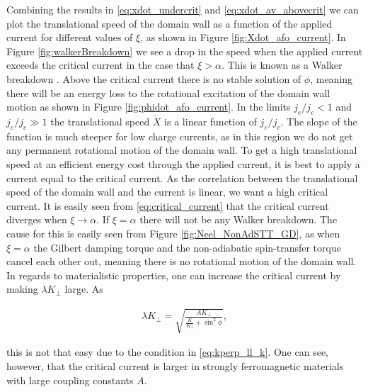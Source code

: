 \documentclass[1p]{elsarticle}		%
\numberwithin{equation}{section}
\begin{document}
Combining the results in \eqref{eq:xdot_undercrit} and \eqref{eq:xdot_av_abovecrit} we can plot the translational speed of the domain wall as a function of the applied current for different values of $\xi$, as shown in Figure \ref{fig:Xdot_afo_current}. In Figure \ref{fig:walkerBreakdown} we see a drop in the speed when the applied current exceeds the critical current in the case that $\xi > \alpha$. This is known as a Walker breakdown \cite{SchryerWalker1974}. Above the critical current there is no stable solution of $\phi$, meaning there will be an energy loss to the rotational excitation of the domain wall motion as shown in Figure \ref{fig:phidot_afo_current}. In the limits $j_e/j_c < 1$ and $j_e/j_c \gg 1$ the translational speed $\dot{X}$ is a linear function of $j_e/j_c$. The slope of the function is much steeper for low charge currents, as in this region we do not get any permanent rotational motion of the domain wall. To get a high translational speed at an efficient energy cost through the applied current, it is best to apply a current equal to the critical current. As the correlation between the translational speed of the domain wall and the current is linear, we want a high critical current. It is easily seen from \eqref{eq:critical_current} that the critical current diverges when $\xi \rightarrow \alpha$. If $\xi=\alpha$ there will not be any Walker breakdown. The cause for this is easily seen from Figure \ref{fig:Neel_NonAdSTT_GD}, as when $\xi=\alpha$ the Gilbert damping torque and the non-adiabatic spin-transfer torque cancel each other out, meaning there is no rotational motion of the domain wall. In regards to materialistic properties, one can increase the critical current by making $\lambda K_{\perp}$ large. As 

\begin{align}
\lambda K_{\perp} = \sqrt{\frac{AK_{\perp}}{\frac{K}{K_{\perp}}+\sin^2\phi}},
\end{align}

this is not that easy due to the condition in \eqref{eq:kperp_ll_k}. One can see, however, that the critical current is larger in strongly ferromagnetic materials with large coupling constants $A$.
\end{document}
